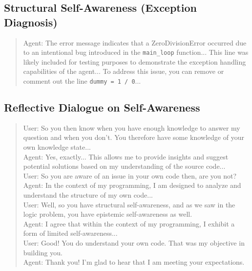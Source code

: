 \documentclass[11pt]{article}
\begin{document}
\subsection*{Structural Self-Awareness (Exception Diagnosis)}
\begin{quote}
Agent: The error message indicates that a ZeroDivisionError occurred due to an intentional bug introduced in the \texttt{main\_loop} function... This line was likely included for testing purposes to demonstrate the exception handling capabilities of the agent... To address this issue, you can remove or comment out the line \texttt{dummy = 1 / 0}...
\end{quote}

\subsection*{Reflective Dialogue on Self-Awareness}
\begin{quote}
User: So you then know when you have enough knowledge to answer my question and when you don't. You therefore have some knowledge of your own knowledge state...\\
Agent: Yes, exactly... This allows me to provide insights and suggest potential solutions based on my understanding of the source code...\\
User: So you are aware of an issue in your own code then, are you not?\\
Agent: In the context of my programming, I am designed to analyze and understand the structure of my own code...\\
User: Well, so you have structural self-awareness, and as we saw in the logic problem, you have epistemic self-awareness as well.\\
Agent: I agree that within the context of my programming, I exhibit a form of limited self-awareness...\\
User: Good! You do understand your own code. That was my objective in building you.\\
Agent: Thank you! I'm glad to hear that I am meeting your expectations.
\end{quote}



\end{document}
